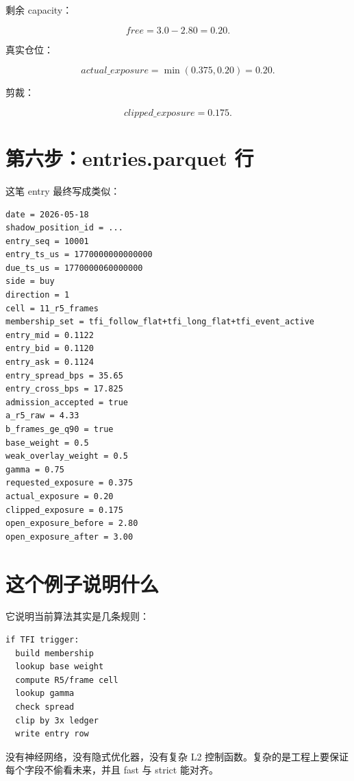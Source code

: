剩余 capacity：

\[
free=3.0-2.80=0.20.
\]

真实仓位：

\[
actual\_exposure=\min(0.375,0.20)=0.20.
\]

剪裁：

\[
clipped\_exposure=0.175.
\]

\section{第六步：entries.parquet 行}

这笔 entry 最终写成类似：

\begin{lstlisting}
date = 2026-05-18
shadow_position_id = ...
entry_seq = 10001
entry_ts_us = 1770000000000000
due_ts_us = 1770000060000000
side = buy
direction = 1
cell = 11_r5_frames
membership_set = tfi_follow_flat+tfi_long_flat+tfi_event_active
entry_mid = 0.1122
entry_bid = 0.1120
entry_ask = 0.1124
entry_spread_bps = 35.65
entry_cross_bps = 17.825
admission_accepted = true
a_r5_raw = 4.33
b_frames_ge_q90 = true
base_weight = 0.5
weak_overlay_weight = 0.5
gamma = 0.75
requested_exposure = 0.375
actual_exposure = 0.20
clipped_exposure = 0.175
open_exposure_before = 2.80
open_exposure_after = 3.00
\end{lstlisting}

\section{这个例子说明什么}

它说明当前算法其实是几条规则：

\begin{lstlisting}
if TFI trigger:
  build membership
  lookup base weight
  compute R5/frame cell
  lookup gamma
  check spread
  clip by 3x ledger
  write entry row
\end{lstlisting}

没有神经网络，没有隐式优化器，没有复杂 L2 控制函数。复杂的是工程上要保证每个字段不偷看未来，并且 fast 与 strict 能对齐。

